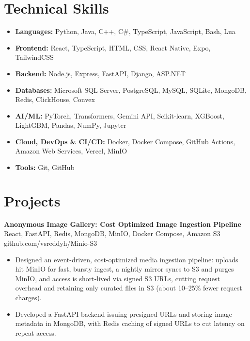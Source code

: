 \documentclass[a4paper,11pt]{article}
\newcommand{\resumeItem}[1]{\item \small{#1}}
\newcommand{\resumeSubheading}[4]{%
  \textbf{#1} \hfill \textbf{#2} \\
{#3} \hfill {#4}
}
\newcommand{\resumeSubHeadingListStart}{\begin{itemize}}
\newcommand{\resumeSubHeadingListEnd}{\end{itemize}}
\begin{document}
\section*{Technical Skills}
\begin{itemize}
\item \textbf{Languages:} Python, Java, C++, C\#, TypeScript, JavaScript, Bash, Lua
\item \textbf{Frontend:} React, TypeScript, HTML, CSS, React Native, Expo, TailwindCSS
\item \textbf{Backend:} Node.js, Express, FastAPI, Django, ASP.NET
\item \textbf{Databases:} Microsoft SQL Server, PostgreSQL, MySQL, SQLite, MongoDB, Redis, ClickHouse, Convex
\item \textbf{AI/ML:} PyTorch, Transformers, Gemini API, Scikit-learn, XGBoost, LightGBM, Pandas, NumPy, Jupyter
\item \textbf{Cloud, DevOps \& CI/CD:} Docker, Docker Compose, GitHub Actions, Amazon Web Services, Vercel, MinIO
\item \textbf{Tools:} Git, GitHub
\end{itemize}


\section*{Projects}


\resumeSubheading
{Anonymous Image Gallery: Cost Optimized Image Ingestion Pipeline}{}{React, FastAPI, Redis, MongoDB, MinIO, Docker Compose, Amazon S3}{github.com/vsreddyh/Minio-S3}
\resumeSubHeadingListStart
\resumeItem{Designed an event-driven, cost-optimized media ingestion pipeline: uploads hit MinIO for fast, bursty ingest, a nightly mirror syncs to S3 and purges MinIO, and access is short-lived via signed S3 URLs, cutting request overhead and retaining only curated files in S3 (about 10--25\% fewer request charges).}
\resumeItem{Developed a FastAPI backend issuing presigned URLs and storing image metadata in MongoDB, with Redis caching of signed URLs to cut latency on repeat access.}
\resumeSubHeadingListEnd

\vspace{-0.6em}
\end{document}
